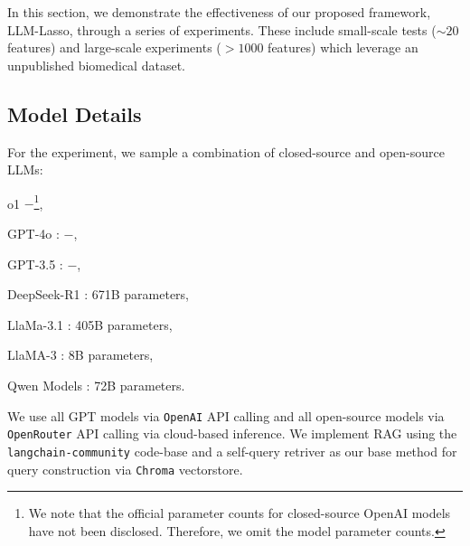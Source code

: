In this section, we demonstrate the effectiveness of our proposed framework, LLM-Lasso, through a series of experiments. These include small-scale tests ($\sim 20$ features) and large-scale experiments ($> 1000$ features) which leverage an unpublished biomedical dataset.

\subsection{Model Details}\label{subsec:model} For the experiment, we sample a combination of closed-source and open-source LLMs:
\begin{compactenum}
    \item o1 \citep{openai_gpt_o1} $-$\footnote{We note that the official parameter counts for closed-source OpenAI models have not been disclosed. Therefore, we omit the model parameter counts.},
    \item GPT-4o \citep{openai2023gpt4}: $-$,
    \item GPT-3.5 \citep{openai2023gpt35}: $-$,
    \item DeepSeek-R1 \citep{deepseek_r1}: 671B parameters,
    \item LlaMa-3.1 \citep{llama_405b}: 405B parameters,
    \item LlaMA-3 \citep{llama3_8b_instruct}: 8B parameters,
    \item Qwen Models \citep{qwen_models}: 72B parameters.
\end{compactenum}
We use all GPT models via \texttt{OpenAI} API calling and all open-source models via \texttt{OpenRouter} API calling via cloud-based inference. We implement RAG using the \texttt{langchain-community} \citep{langchain_community} code-base and a self-query retriver as our base method for query construction via \texttt{Chroma} vectorstore.

